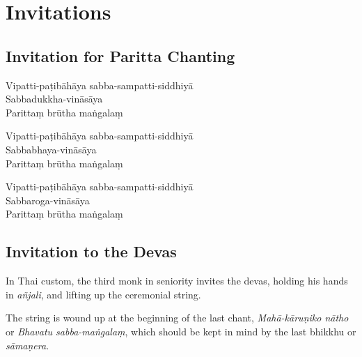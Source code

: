 \clearpage

\section{Invitations}

\subsection{Invitation for Paritta Chanting}
\label{paritta-invitation-for-chanting}


\vspace*{5pt}

\begin{paritta}


Vipatti-paṭibāhāya sabba-sampatti-siddhiyā\\
Sabbadukkha-vināsāya\\
Parittaṃ brūtha maṅgalaṃ

Vipatti-paṭibāhāya sabba-sampatti-siddhiyā\\
Sabbabhaya-vināsāya\\
Parittaṃ brūtha maṅgalaṃ

Vipatti-paṭibāhāya sabba-sampatti-siddhiyā\\
Sabbaroga-vināsāya\\
Parittaṃ brūtha maṅgalaṃ

\end{paritta}


\subsection{Invitation to the Devas}
\label{paritta-devas}


In Thai custom, the third monk in seniority invites the devas, holding his
hands in \emph{añjali}, and lifting up the ceremonial string.

The string is wound up at the beginning of the last chant, \emph{Mahā-kāruṇiko
  nātho} or \emph{Bhavatu sabba-maṅgalaṃ}, which should be kept in mind by the
last bhikkhu or \emph{sāmaṇera}.

